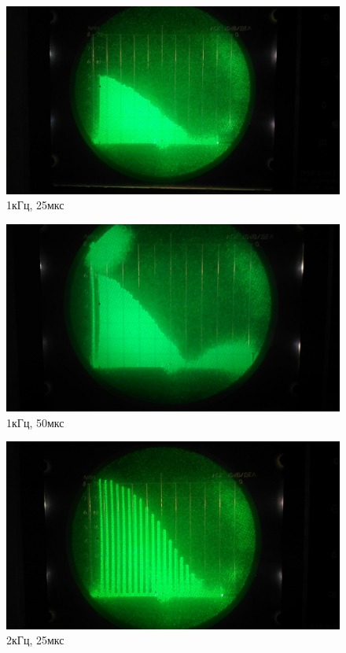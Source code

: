 \documentclass[a4paper,12pt]{article}
\begin{document}
		\begin{figure}[h]
			\begin{minipage}[h]{0.32\linewidth}
				\centering
				\includegraphics[width=0.9\linewidth]{pic1} \\ 1кГц, 25мкс
			\end{minipage}
			\hfill
			\begin{minipage}[h]{0.32\linewidth}
				\centering
				\includegraphics[width=0.9\linewidth]{pic2} \\ 1кГц, 50мкс
			\end{minipage}
			\hfill
			\begin{minipage}[h]{0.32\linewidth}
				\centering
				\includegraphics[width=0.9\linewidth]{pic3} \\ 2кГц, 25мкс
			\end{minipage}
		\end{figure}
		
\end{document}
